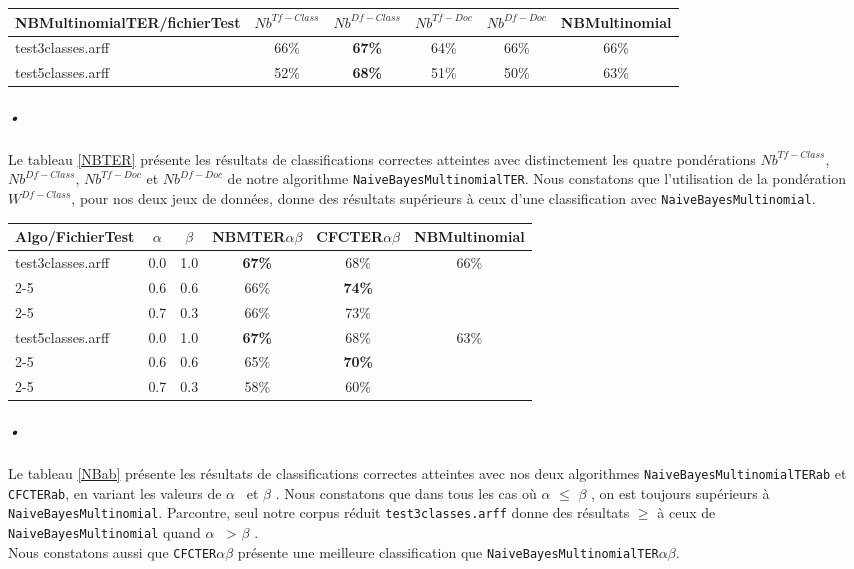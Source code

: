 \documentclass{article}
\begin{document}
\begin{table*}[h]
\centering
    \begin{tabular}{|l|c|c|c|c||c|}
    \hline
    NBMultinomialTER/fichierTest  & $Nb^{Tf-Class}$ & $Nb^{Df-Class}$& $Nb^{Tf-Doc}$ & $Nb^{Df-Doc}$ & NBMultinomial \\ \hline
    test3classes.arff &   66\% & \textbf{67\%}   & 64\%  & 66\% & 66\%  \\ \hline
    test5classes.arff & 52\%  & \textbf{68\%} & 51\% & 50\% & 63\%  \\ \hline
    \end{tabular}
    \caption {Expérimentations avec les quatre pondérations et comparaison avec NBMultinomial}
 \label{NBTER}
\end{table*}
\subparagraph*{•}
Le tableau \ref{NBTER} présente les résultats de classifications correctes atteintes avec distinctement les quatre pondérations $Nb^{Tf-Class}$, $Nb^{Df-Class}$, $Nb^{Tf-Doc}$ et $Nb^{Df-Doc}$ de notre algorithme  \texttt{NaiveBayesMultinomialTER}. Nous constatons que l'utilisation de la pondération $W^{Df-Class}$, pour nos deux jeux de données, donne des résultats supérieurs à ceux d'une classification avec  \texttt{NaiveBayesMultinomial}.
\begin{table*}[h]
\centering
    \begin{tabular}{|l|c|c|c|c||c|}
\hline
 Algo/FichierTest & $\alpha$ & $\beta$ & NBMTER$\alpha$$\beta$ & CFCTER$\alpha$$\beta$ & NBMultinomial \\
    \hline
    test3classes.arff &  0.0 &  1.0& \textbf{67\%} & 68\% & 66\% \\
    \cline{2-5}
         ~ &   0.6  &  0.6 & 66\% & \textbf{74\%} & ~\\
         \cline{2-5}
         ~ &   0.7  &  0.3 & 66\% & 73\% & ~\\
    \hline
     test5classes.arff &  0.0 &  1.0& \textbf{67\%} &68\% & 63\% \\
    \cline{2-5}
         ~ &   0.6  &  0.6 & 65\% & \textbf{70\%} & ~\\
         \cline{2-5}
         ~ &   0.7  &  0.3 & 58\% & 60\% & ~\\
    \hline
    \end{tabular}
    \caption {Expérimentations avec différentes valeurs de $\alpha$  \ et $\beta$ \  pour NBTER$\alpha$$\beta$ \ et CFCTER$\alpha$$\beta$ }
 \label{NBab}
\end{table*}
\subparagraph*{•}
Le tableau \ref{NBab} présente les résultats de classifications correctes atteintes avec nos deux algorithmes \texttt{NaiveBayesMultinomialTERab} et \texttt{CFCTERab}, en variant les valeurs de $\alpha$  \ et $\beta$ . Nous constatons que dans tous les cas où $\alpha$ $ \leq$ $\beta$ , on est toujours supérieurs à  \texttt{NaiveBayesMultinomial}.   Parcontre, seul notre corpus réduit \texttt{test3classes.arff} donne des résultats $\geq$ à ceux de \texttt{NaiveBayesMultinomial} quand $\alpha$ \ > $\beta$ .\\
Nous constatons aussi que \texttt{CFCTER$\alpha$$\beta$} présente une meilleure classification que \texttt{NaiveBayesMultinomialTER$\alpha$$\beta$}.
\end{document}
